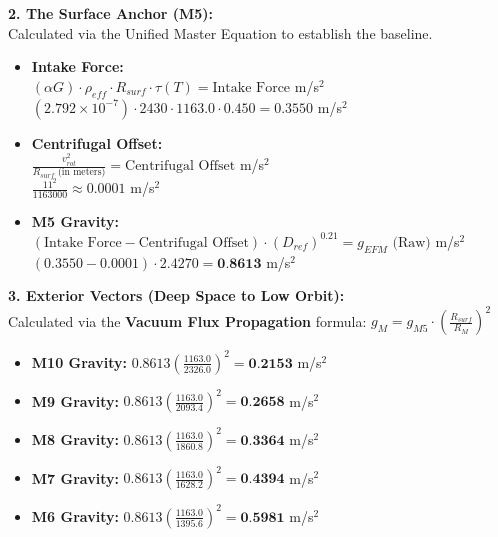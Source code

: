 \documentclass[11pt, a4paper]{article}
\begin{document}
  \vspace{1.0em}
  \noindent \textbf{2. The Surface Anchor (M5):} \\
  \hspace*{1em} Calculated via the Unified Master Equation to establish the baseline.
  \begin{itemize}
    \item \textbf{Intake Force:} \\[0.5em]
    \hspace*{2em} $(\alpha G) \cdot \rho_{eff} \cdot R_{surf} \cdot \tau(T) = \text{Intake Force}$ m/s$^2$ \\[1em]
    \hspace*{2em} $(2.792 \times 10^{-7}) \cdot 2430 \cdot 1163.0 \cdot 0.450 = 0.3550$ m/s$^2$
    
    \item \textbf{Centrifugal Offset:} \\[0.5em]
    \hspace*{2em} $\frac{v_{rot}^2}{R_{surf} \text{ (in meters)}} = \text{Centrifugal Offset}$ m/s$^2$ \\[1em]
    \hspace*{2em} $\frac{11^2}{1163000} \approx 0.0001$ m/s$^2$
    
    \item \textbf{M5 Gravity:} \\[0.5em]
    \hspace*{2em} $(\text{Intake Force} - \text{Centrifugal Offset}) \cdot (D_{ref})^{0.21} = g_{EFM} \text{ (Raw)}$ m/s$^2$ \\[1em]
    \hspace*{2em} $(0.3550 - 0.0001) \cdot 2.4270 = \textbf{0.8613}$ m/s$^2$
  \end{itemize}

  \clearpage
  \noindent \textbf{3. Exterior Vectors (Deep Space to Low Orbit):} \\
  \hspace*{1em} Calculated via the \textbf{Vacuum Flux Propagation} formula: $g_M = g_{M5} \cdot \left( \frac{R_{surf}}{R_M} \right)^2$
  \begin{itemize}
    \item \textbf{M10 Gravity:} $0.8613 \left( \frac{1163.0}{2326.0} \right)^2 = \textbf{0.2153}$ m/s$^2$
    \item \textbf{M9 Gravity:} $0.8613 \left( \frac{1163.0}{2093.4} \right)^2 = \textbf{0.2658}$ m/s$^2$
    \item \textbf{M8 Gravity:} $0.8613 \left( \frac{1163.0}{1860.8} \right)^2 = \textbf{0.3364}$ m/s$^2$
    \item \textbf{M7 Gravity:} $0.8613 \left( \frac{1163.0}{1628.2} \right)^2 = \textbf{0.4394}$ m/s$^2$
    \item \textbf{M6 Gravity:} $0.8613 \left( \frac{1163.0}{1395.6} \right)^2 = \textbf{0.5981}$ m/s$^2$
  \end{itemize}
\end{document}
